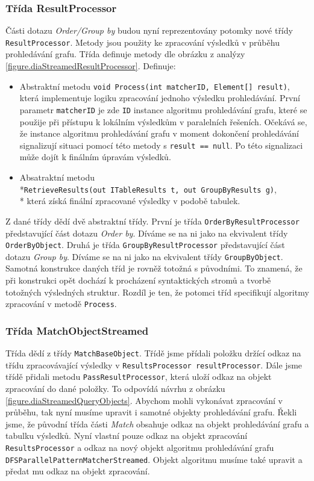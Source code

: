 \subsubsection{Třída ResultProcessor}

Části dotazu \textit{Order/Group by} budou nyní reprezentovány potomky nové třídy \texttt{ResultProcessor}.
Metody jsou použity ke zpracování výsledků v průběhu prohledávání grafu.
Třída definuje metody dle obrázku z analýzy \ref{figure.diaStreamedResultProcessor}.
Definuje:
\begin{itemize}
\item Abstraktní metodu \texttt{void Process(int matcherID, Element[] result)}, která implementuje logiku zpracování jednoho výsledku prohledávání.
První parametr \texttt{matcherID} je zde \texttt{ID} instance algoritmu prohledávání grafu, které se použije při přístupu k lokálním výsledkům v paralelních řešeních.
Očekává se, že instance algoritmu prohledávání grafu v moment dokončení prohledávání signalizují situaci pomocí této metody s \texttt{result == null}.
Po této signalizaci může dojít k finálním úpravám výsledků.
\item Absatraktní metodu \\*\texttt{RetrieveResults(out ITableResults t, out GroupByResults g)},\\* která získá finální zpracované výsledky v podobě tabulek. 
\end{itemize}
Z dané třídy dědí dvě abstraktní třídy.
První je třída \texttt{OrderByResultProcessor} představující část dotazu \textit{Order by}.
Díváme se na ni jako na ekvivalent třídy \texttt{OrderByObject}. 
Druhá je třída \texttt{GroupByResultProcessor} představující část dotazu \textit{Group by}.
Díváme se na ni jako na ekvivalent třídy \texttt{GroupByObject}.
Samotná konstrukce daných tříd je rovněž totožná s původními.
To znamená, že při konstrukci opět dochází k procházení syntaktických stromů a tvorbě totožných výsledných struktur.
Rozdíl je ten, že potomci tříd specifikují algoritmy zpracování v metodě \texttt{Process}.   

\subsubsection{Třída MatchObjectStreamed}

Třída dědí z třídy \texttt{MatchBaseObject}.
Třídě jsme přídali položku držící odkaz na třídu zpracovávající výsledky v \texttt{ResultsProcessor resultProcessor}.
Dále jsme třídě přidali metodu \texttt{PassResultProcessor}, která uloží odkaz na objekt zpracování do dané položky.
To odpovídá návrhu z obrázku \ref{figure.diaStreamedQueryObjects}.
Abychom mohli vykonávat zpracování v průběhu, tak nyní musíme upravit i samotné objekty prohledávání grafu.
Řekli jsme, že původní třída části \textit{Match} obsahuje odkaz na objekt prohledávání grafu a tabulku výsledků.
Nyní vlastní pouze odkaz na objekt zpracování \texttt{ResultsProcessor} a odkaz na nový objekt algoritmu prohledávání grafu \texttt{DFSParallelPatternMatcherStreamed}.
Objekt algoritmu musíme také upravit a předat mu odkaz na objekt zpracování.

